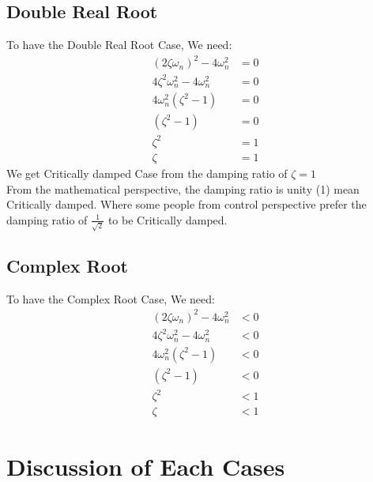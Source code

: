 \documentclass[12pt,a4paper]{article}
\begin{document}
	
	\subsection{Double Real Root}
	To have the Double Real Root Case, We need:
	\[ 
	\begin{split}
		(2\zeta\omega_n)^2 - 4\omega_n^2 &= 0 \\
		4\zeta^2\omega_n^2 - 4\omega_n^2 &= 0 \\
		4\omega_n^2 (\zeta^2 - 1) &= 0 \\
		(\zeta^2 - 1) &= 0 \\
		\zeta^2  &= 1 \\
		\zeta &= 1
	\end{split}
	\]
	We get Critically damped Case from the damping ratio of $ \boxed{\zeta = 1} $ \\
	From the mathematical perspective, the damping ratio is unity (1) mean Critically damped. Where some people from control perspective prefer the damping ratio of $ \frac{1}{\sqrt{2}} $ to be Critically damped.
	
	
	\subsection{Complex Root}
	To have the Complex Root Case, We need:
	\[ 
	\begin{split}
		(2\zeta\omega_n)^2 - 4\omega_n^2 &< 0 \\
		4\zeta^2\omega_n^2 - 4\omega_n^2 &< 0 \\
		4\omega_n^2 (\zeta^2 - 1) &< 0 \\
		(\zeta^2 - 1) &< 0 \\
		\zeta^2  &< 1 \\
		\zeta &< 1
	\end{split}
	\]
	
	\section{Discussion of Each Cases}
\end{document}
